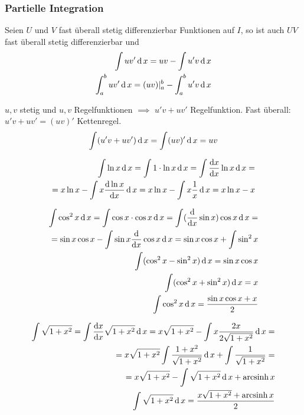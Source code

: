 \subsubsection{Partielle Integration}
\begin{Sat}
  Seien $U$ und $V$ fast überall stetig differenzierbar Funktionen auf $I$, so ist auch $UV$ fast überall stetig differenzierbar und
  \begin{align*}
    \int uv'\operatorname{d} x=uv-\int u'v\operatorname{d} x\\
    \int^b_auv'\operatorname{d} x=(uv)|^b_a-\int^b_au'v\operatorname{d} x
  \end{align*}
\end{Sat}
\begin{Bew}
  $u,v$ stetig und $u,v$ Regelfunktionen $\implies$ $u'v+uv'$ Regelfunktion. Fast überall: $u'v+uv'=(uv)'$ Kettenregel.
  \begin{align*}
    \int(u'v+uv')\operatorname{d} x=\int(uv)'\operatorname{d} x=uv
  \end{align*}
\end{Bew}
\begin{Bsp}
  \begin{align*}
    \int\ln x\operatorname{d} x=\int 1 \cdot \ln x \operatorname{d} x=\int\displaystyle\frac{\mathrm{d}x}{\mathrm{d}x}\ln x\operatorname{d} x=\\
    =x\ln x-\int x\displaystyle\frac{\mathrm{d}\ln x}{\mathrm{d}x} \operatorname{d} x=x\ln x-\int x\frac{1}{x}\operatorname{d} x=x\ln x-x
  \end{align*}
\end{Bsp}
\begin{Bsp}
  \begin{align*}
    \int \cos^2x\operatorname{d} x=\int \cos x \cdot \cos x\operatorname{d} x = \int(\displaystyle\frac{\mathrm{d}}{\mathrm{d}x}\sin x)\cos x \operatorname{d} x=\\
    =\sin x \cos x -\int \sin x \displaystyle\frac{\mathrm{d}}{\mathrm{d}x}\cos x \operatorname{d} x = \sin x \cos x +\int \sin^2 x\\
    \int(\cos^2x-\sin^2x)\operatorname{d} x = \sin x \cos x\\
    \int(\cos^2x+\sin^2x)\operatorname{d} x = x\\
    \int \cos^2x\operatorname{d} x=\frac{\sin x\cos x+ x}{2}
  \end{align*}
\end{Bsp}
\begin{Bsp}
  \begin{align*}
    \int\sqrt{1+x^2}=\int\displaystyle\frac{\mathrm{d}x}{\mathrm{d}x}\sqrt{1+x^2}\operatorname{d} x=x\sqrt{1+x^2}-\int x\frac{2x}{2\sqrt{1+x^2}}\operatorname{d} x=\\
    =x\sqrt{1+x^2} \int\frac{1+x^2}{\sqrt{1+x^2}}\operatorname{d} x+\int\frac{1}{\sqrt{1+x^2}}=\\
    =x\sqrt{1+x^2}-\int\sqrt{1+x^2}\operatorname{d} x+\operatorname{arcsinh} x\\
    \int\sqrt{1+x^2}\operatorname{d} x=\frac{x\sqrt{1+x^2}+\operatorname{arcsinh} x}{2}
  \end{align*}
\end{Bsp}
